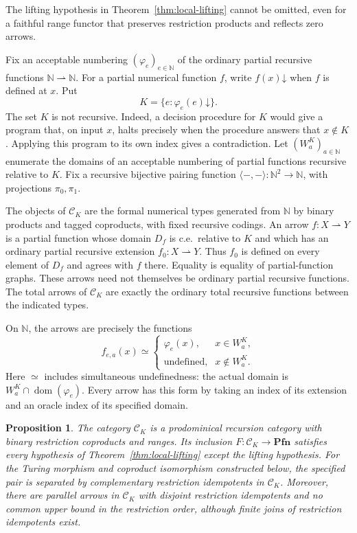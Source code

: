 \documentclass[11pt]{article}
\newtheorem{proposition}[theorem]{Proposition}
\newcommand{\N}{\mathbb N}
\newcommand{\Pfn}{\mathbf{Pfn}}
\begin{document}
The lifting hypothesis in Theorem~\ref{thm:local-lifting} cannot be
omitted, even for a faithful range functor that preserves restriction
products and reflects zero arrows.

Fix an acceptable numbering $(\varphi_e)_{e\in\N}$ of the ordinary
partial recursive functions $\N\rightharpoonup\N$. For a partial
numerical function $f$, write $f(x)\mathord\downarrow$ when $f$ is
defined at $x$. Put
\[
 K=\{e:\varphi_e(e)\mathord\downarrow\}.
\]
The set $K$ is not recursive. Indeed, a decision procedure for $K$
would give a program that, on input $x$, halts precisely when the
procedure answers that $x\notin K$. Applying this program to its own
index gives a contradiction.
Let $(W_a^K)_{a\in\N}$ enumerate the domains of an acceptable
numbering of partial functions recursive relative to $K$.
Fix a recursive bijective pairing function
$\langle-,-\rangle:\N^2\to\N$, with projections $\pi_0,\pi_1$.

The objects of $\mathcal C_K$ are the formal numerical types generated
from $\N$ by binary products and tagged coproducts, with fixed recursive
codings. An arrow $f:X\rightharpoonup Y$ is a partial function whose
domain $D_f$ is c.e.\ relative to $K$ and which has an ordinary partial
recursive extension $f_0:X\rightharpoonup Y$. Thus $f_0$ is defined
on every element of $D_f$ and agrees with $f$ there. Equality is equality
of partial-function graphs. These arrows need not themselves be ordinary
partial recursive functions. The total arrows of $\mathcal C_K$ are exactly
the ordinary total recursive functions between the indicated types.

On $\N$, the arrows are precisely the functions
\[
 f_{e,a}(x)\simeq
 \begin{cases}
  \varphi_e(x),&x\in W_a^K,\\
  \text{undefined},&x\notin W_a^K.
 \end{cases}
\]
Here $\simeq$ includes simultaneous undefinedness: the actual domain
is $W_a^K\cap\operatorname{dom}(\varphi_e)$. Every arrow has this
form by taking an index of its extension and an oracle index of its
specified domain.

\begin{proposition}\label{prop:missing-lift}
The category $\mathcal C_K$ is a prodominical recursion category with
binary restriction coproducts and ranges. Its inclusion
$F:\mathcal C_K\to\Pfn$ satisfies every hypothesis of
Theorem~\ref{thm:local-lifting} except the lifting hypothesis.
For the Turing morphism and coproduct isomorphism constructed below,
the specified pair is separated by complementary restriction idempotents in
$\mathcal C_K$. Moreover, there are parallel arrows in $\mathcal C_K$
with disjoint restriction idempotents and no common upper bound in
the restriction order, although finite joins of restriction idempotents
exist.
\end{proposition}
\end{document}
